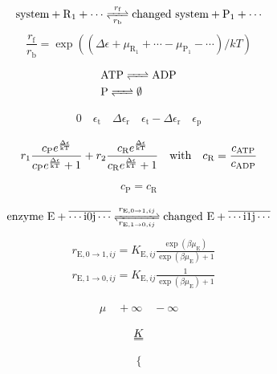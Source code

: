 \documentclass[12pt]{article}
\newcommand{\duf}[2]{\stackunder[0.5pt]{\stackunder[0.8pt]{\stackunder[1pt]{\ensuremath{#1}}{\rule{\widthof{\ensuremath{#2}}*\real{0.9}}{.1ex}}}{\rule{\widthof{\ensuremath{#2}}*\real{0.9}}{.1ex}}}{}}
\newcommand{\du}[1]{\duf{#1}{#1}}
\begin{document}
\begin{equation*}
	\ce{\text{system} + R_1 + {\cdots} <=>[$r_\text{f}$][$r_\text{b}$] \text{changed system} + P_1 + {\cdots}}
\end{equation*}
\begin{equation*}
    \frac{r_\text{f}}{r_\text{b}} = \exp((\Delta\epsilon + \mu_{\text{R}_1} + \cdots - \mu_{\text{P}_1} - \cdots) / \si{kT})
\end{equation*}

\vspace{3em}
\begin{align*}
	 & \ce{\text{ATP} <=> \text{ADP}} \\
	 & \ce{\text{P} <=> \emptyset}
\end{align*}

\vspace{3em}
\begin{align*}
	0 \quad \epsilon_\text{t} \quad \Delta\epsilon_\text{r} \quad \epsilon_\text{t} - \Delta\epsilon_\text{r} \quad \epsilon_\text{p}
\end{align*}

\vspace{3em}
\begin{align*}
    r_1 \frac{c_\text{P}e^{\frac{\Delta\epsilon}{\si{kT}}}}{c_\text{P}e^{\frac{\Delta\epsilon}{\si{kT}}}+1} + r_2 \frac{c_\text{R}e^{\frac{\Delta\epsilon}{\si{kT}}}}{c_\text{R}e^{\frac{\Delta\epsilon}{\si{kT}}}+1} \qq{with} c_\text{R}=\frac{c_\text{ATP}}{c_\text{ADP}}
\end{align*}

\vspace{3em}
\begin{align*}
    c_\text{P} = c_\text{R}
\end{align*}

\vspace{3em}
\begin{equation*}
	\ce{\text{enzyme E} + \overline{\cdots i0j \cdots} <=>[$r_{\text{E},0\rightarrow1,ij}$][$r_{\text{E},1\rightarrow0,ij}$] \text{changed E} + \overline{\cdots i1j \cdots}}
\end{equation*}
\begin{align*}
	 & r_{\text{E},0\rightarrow1,ij} = K_{\text{E},ij} \frac{\exp(\beta\mu_\text{E})}{\exp(\beta\mu_\text{E})+1} \\
	 & r_{\text{E},1\rightarrow0,ij} = K_{\text{E},ij} \frac{1}{\exp(\beta\mu_\text{E})+1}
\end{align*}

\vspace{3em}
\begin{align*}
    \mu \quad +\infty \quad -\infty
\end{align*}

\vspace{3em}
\begin{align*}
    \du{K}
\end{align*}

\vspace{3em}
\begin{align*}
    \Biggl\{
\end{align*}
\end{document}
